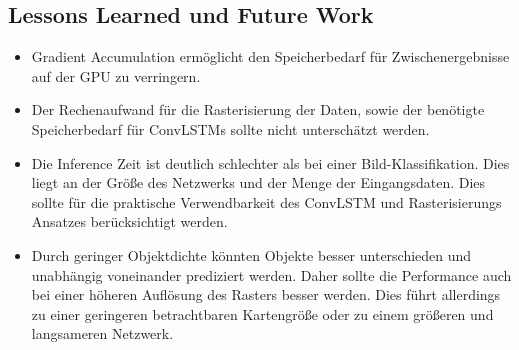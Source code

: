 \documentclass[12pt]{article}
\begin{document}
    \subsection{Lessons Learned und Future Work}
        \begin{itemize}
            \item Gradient Accumulation ermöglicht den Speicherbedarf für Zwischenergebnisse auf der GPU zu verringern.
            \item Der Rechenaufwand für die Rasterisierung der Daten, sowie der benötigte Speicherbedarf für ConvLSTMs sollte nicht unterschätzt werden.
            \item Die Inference Zeit ist deutlich schlechter als bei einer Bild-Klassifikation. 
            Dies liegt an der Größe des Netzwerks und der Menge der Eingangsdaten. 
            Dies sollte für die praktische Verwendbarkeit des ConvLSTM und Rasterisierungs Ansatzes berücksichtigt werden. 
            \item Durch geringer Objektdichte könnten Objekte besser unterschieden und unabhängig voneinander prediziert werden. 
            Daher sollte die Performance auch bei einer höheren Auflösung des Rasters besser werden.
            Dies führt allerdings zu einer geringeren betrachtbaren Kartengröße oder zu einem größeren und langsameren Netzwerk.
        \end{itemize}
\pagebreak
{}

\end{document}
